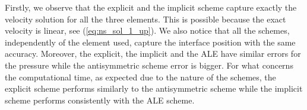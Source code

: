 Firstly, we observe that the explicit and the implicit scheme capture exactly
the velocity solution for all the three elements. This is possible because the
exact velocity is linear, see (\ref{eq:ns_sol_1_up}). We  also notice that
all the schemes, independently of the element used, capture the interface
position with the same accuracy. Moreover, the explicit, the implicit and the
ALE have similar errors for the pressure while the antisymmetric scheme error
is bigger. For what concerns the computational time, as expected due to the
nature  of the schemes, the explicit scheme performs similarly to the
antisymmetric scheme while the implicit scheme performs consistently with the
ALE scheme.

